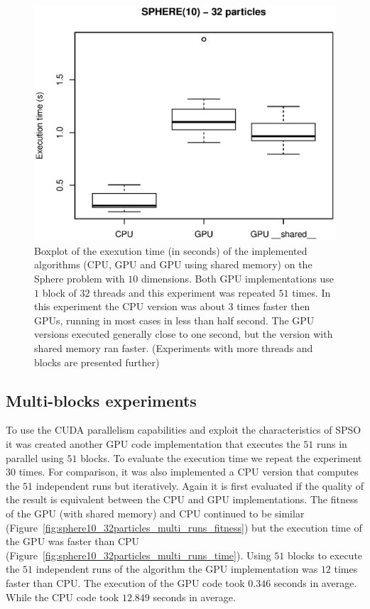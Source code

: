 \documentclass[conference]{IEEEtran}
\begin{document}
    \begin{figure}[!htb]
        \centering
        \includegraphics[width=\columnwidth]{../img/sphere10_32particles_time.eps}
        \caption{Boxplot of the exexution time (in seconds) of the implemented algorithms (CPU, GPU and GPU using shared memory) on the Sphere problem with $10$ dimensions. Both GPU implementations use $1$ block of $32$ threads and this experiment was repeated $51$ times. In this experiment the CPU version was about $3$ times faster then GPUs, running in most cases in less than half second. The GPU versions executed generally close to one second, but the version with shared memory ran faster. (Experiments with more threads and blocks are presented further)}
        \label{fig:sphere10_32particles_time}
    \end{figure}


    \subsection{Multi-blocks experiments}

    To use the CUDA parallelism capabilities and exploit the characteristics of SPSO it was created another GPU code implementation that executes the $51$ runs in parallel using $51$ blocks. To evaluate the execution time we repeat the experiment $30$ times. For comparison, it was also implemented a CPU version that computes the $51$ independent runs but iteratively.
    Again it is first evaluated if the quality of the result is equivalent between the CPU and GPU implementations.
    The fitness of the GPU (with shared memory) and CPU continued to be similar (Figure~\ref{fig:sphere10_32particles_multi_runs_fitness}) but the execution time of the GPU was faster than CPU (Figure~\ref{fig:sphere10_32particles_multi_runs_time}).
    Using $51$ blocks to execute the $51$ independent runs of the algorithm the GPU implementation was $12$ times faster than CPU. The execution of the GPU code took $0.346$ seconds in average. While the CPU code took $12.849$ seconds in average.
\end{document}
